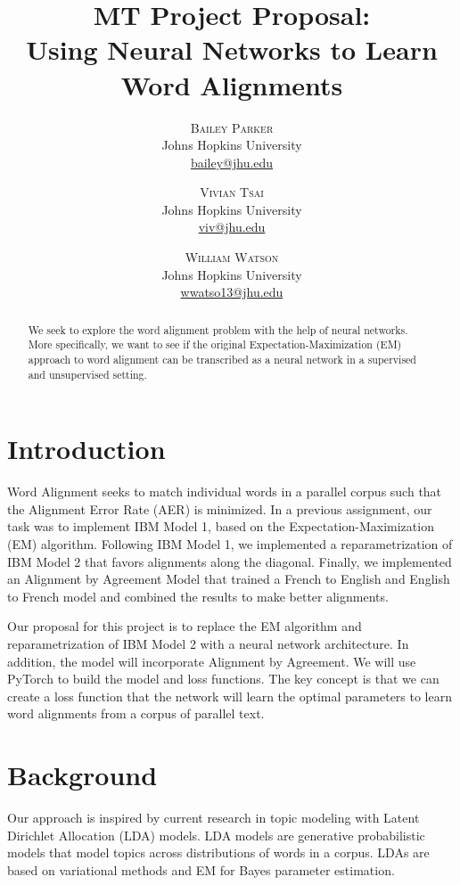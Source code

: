 \documentclass[twoside,twocolumn]{article}
\title{MT Project Proposal: \\ Using Neural Networks to Learn Word Alignments}
\author{%
\textsc{Bailey Parker} \\[1ex]
\normalsize Johns Hopkins University \\
\normalsize \href{mailto:bailey@jhu.edu}{bailey@jhu.edu}
 \and
 \textsc{Vivian Tsai} \\[1ex]
\normalsize Johns Hopkins University \\
\normalsize \href{mailto:viv@jhu.edu}{viv@jhu.edu}
 \and
  \textsc{William Watson} \\[1ex]
\normalsize Johns Hopkins University \\
\normalsize \href{mailto:wwatso13@jhu.edu}{wwatso13@jhu.edu}
}
\date{}%
\begin{document}
\maketitle





\begin{abstract}
We seek to explore the word alignment problem with the help of neural networks. More specifically, we want to see if the original Expectation-Maximization (EM) approach to word alignment can be transcribed as a neural network in a supervised and unsupervised setting.
\end{abstract}


\section{Introduction}
Word Alignment seeks to match individual words in a parallel corpus such that the Alignment Error Rate (AER) is minimized. In a previous assignment, our task was to implement IBM Model 1, based on the Expectation-Maximization (EM) algorithm. Following IBM Model 1, we implemented a reparametrization of IBM Model 2 that favors alignments along the diagonal. Finally, we implemented an Alignment by Agreement Model that trained a French to English and English to French model and combined the results to make better alignments.

Our proposal for this project is to replace the EM algorithm and reparametrization of IBM Model 2 with a neural network architecture. In addition, the model will incorporate Alignment by Agreement. We will use PyTorch to build the model and loss functions. The key concept is that we can create a loss function that the network will learn the optimal parameters to learn word alignments from a corpus of parallel text.


\section{Background}
Our approach is inspired by current research in topic modeling with Latent Dirichlet Allocation (LDA) models. LDA models are generative probabilistic models that model topics across distributions of words in a corpus. LDAs are based on variational methods and EM for Bayes parameter estimation.
\end{document}

